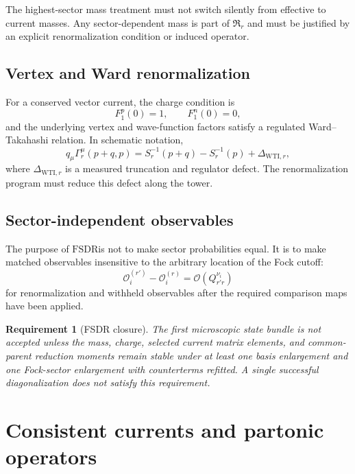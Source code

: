 \documentclass[11pt]{article}
\newtheorem{requirement}[definition]{Requirement}
\newcommand{\cO}{\mathcal O}
\newcommand{\FSDR}{\ensuremath{\mathrm{FSDR}}}
\newcommand{\WTI}{\ensuremath{\mathrm{WTI}}}
\begin{document}
The highest-sector mass treatment must not switch silently from effective to
current masses.  Any sector-dependent mass is part of \(\mathfrak R_r\) and
must be justified by an explicit renormalization condition or induced operator.

\subsection{Vertex and Ward renormalization}

For a conserved vector current, the charge condition is
\begin{equation}
 F_1^p(0)=1,
 \qquad
 F_1^n(0)=0,
 \label{eq:charge-renorm}
\end{equation}
and the underlying vertex and wave-function factors satisfy a regulated
Ward--Takahashi relation.  In schematic notation,
\begin{equation}
 q_\mu\Gamma_r^\mu(p+q,p)
 =S_r^{-1}(p+q)-S_r^{-1}(p)
 +\Delta_{\WTI,r},
 \label{eq:wti}
\end{equation}
where \(\Delta_{\WTI,r}\) is a measured truncation and regulator defect.
The renormalization program must reduce this defect along the tower.

\subsection{Sector-independent observables}

The purpose of \FSDR is not to make sector probabilities equal.  It is to make
matched observables insensitive to the arbitrary location of the Fock cutoff:
\begin{equation}
 \cO_i^{(r')}
 -\cO_i^{(r)}
 =\cO\!\left(Q_{r'r}^{\nu_i}\right)
 \label{eq:observable-convergence}
\end{equation}
for renormalization and withheld observables after the required comparison
maps have been applied.

\begin{requirement}[FSDR closure]
The first microscopic state bundle is not accepted unless the mass, charge,
selected current matrix elements, and common-parent reduction moments remain
stable under at least one basis enlargement and one Fock-sector enlargement
with counterterms refitted.  A single successful diagonalization does not
satisfy this requirement.
\label{req:fsdr-closure}
\end{requirement}

\section{Consistent currents and partonic operators}
\label{sec:operators}
\end{document}
